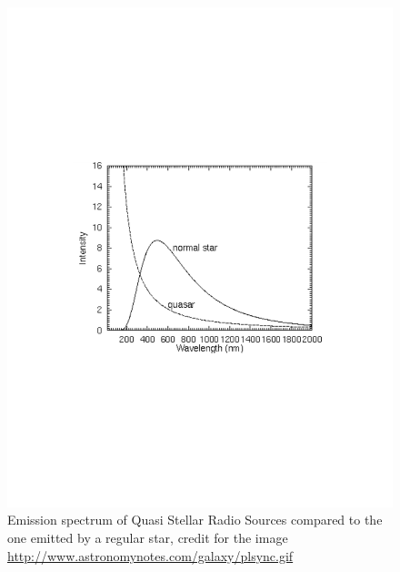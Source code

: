\documentclass[11pt, a4paper,oneside,openright]{book}
\numberwithin{equation}{section}
\begin{document}
\begin{figure}
\begin{center}
\includegraphics[scale=0.8]{Draw/quasar_spec_ideal.pdf}
\end{center}
\caption{Emission spectrum of Quasi Stellar Radio Sources compared to the one emitted by a regular star, credit for the image \url{http://www.astronomynotes.com/galaxy/plsync.gif}}
\label{quasarspecideal}
\end{figure} 
\end{document}

